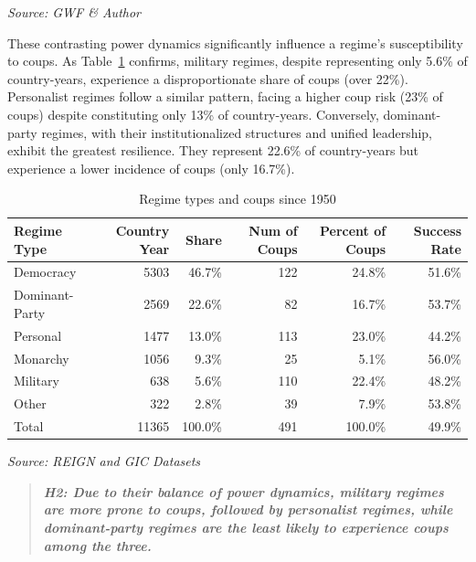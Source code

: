 \documentclass[
  12pt,
]{report}
\begin{document}
\begin{minipage}{\linewidth}
\emph{Source: GWF \& Author}\\
\end{minipage}
\endgroup

These contrasting power dynamics significantly influence a regime's
susceptibility to coups. As Table~\ref{tbl-regimes} confirms, military
regimes, despite representing only 5.6\% of country-years, experience a
disproportionate share of coups (over 22\%). Personalist regimes follow
a similar pattern, facing a higher coup risk (23\% of coups) despite
constituting only 13\% of country-years. Conversely, dominant-party
regimes, with their institutionalized structures and unified leadership,
exhibit the greatest resilience. They represent 22.6\% of country-years
but experience a lower incidence of coups (only 16.7\%).

\begingroup
\setlength{}
\setlength{}\fontsize{12.0pt}{14.4pt}\selectfont
\setlength{\LTpost}{0mm}

\begin{longtable}{@{\extracolsep{\fill}}lrrrrr}

\caption{\label{tbl-regimes}Regime types and coups since 1950}

\tabularnewline

\toprule
Regime Type & Country Year & Share & Num of Coups & Percent of Coups & Success Rate \\ 
\midrule\addlinespace[2.5pt]
Democracy & 5303 & 46.7\% & 122 & 24.8\% & 51.6\% \\ 
Dominant-Party & 2569 & 22.6\% & 82 & 16.7\% & 53.7\% \\ 
Personal & 1477 & 13.0\% & 113 & 23.0\% & 44.2\% \\ 
Monarchy & 1056 & 9.3\% & 25 & 5.1\% & 56.0\% \\ 
Military & 638 & 5.6\% & 110 & 22.4\% & 48.2\% \\ 
Other & 322 & 2.8\% & 39 & 7.9\% & 53.8\% \\ 
Total & 11365 & 100.0\% & 491 & 100.0\% & 49.9\% \\ 
\bottomrule

\end{longtable}

\begin{minipage}{\linewidth}
\emph{Source: REIGN and GIC Datasets}\\
\end{minipage}
\endgroup

\begin{quote}
\textbf{\emph{H2: Due to their balance of power dynamics, military
regimes are more prone to coups, followed by personalist regimes, while
dominant-party regimes are the least likely to experience coups among
the three.}}
\end{quote}
\end{document}

